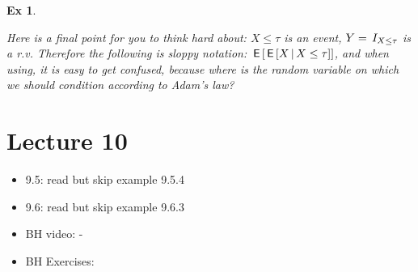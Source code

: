 \documentclass[a4paper,11pt]{article}
\newtheorem{exercise}[theorem]{Ex}
\begin{document}
\begin{exercise}
\begin{solution}
Here is a final point for you to think hard about: ${X\leq \tau}$ is an event, $Y=\,I_{X \leq \tau}$ is a r.v. Therefore the following is sloppy notation: $\,\mathsf{E}\left[\,\mathsf{E}\left[X\,\middle|\, X\leq \tau\right]\right]$, and when using, it is easy to get confused, because where is the random variable  on which we  should condition according to Adam's law?
\end{solution}
\end{exercise}



\section{Lecture 10}


\begin{itemize}
\item 9.5: read but skip example 9.5.4
\item 9.6: read but skip example 9.6.3
\item BH video: -
\item BH Exercises:
\end{itemize}
\end{document}
